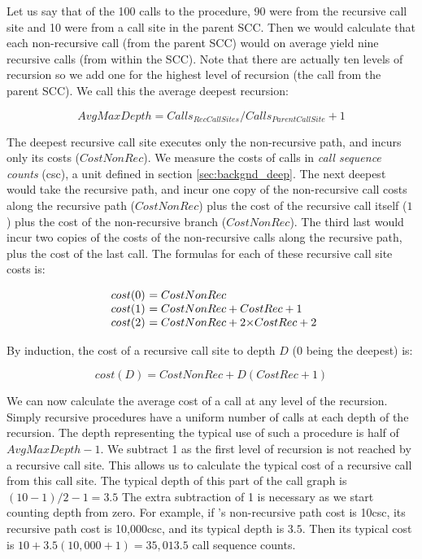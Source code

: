 Let us say that of the 100 calls to the procedure,
90 were from the recursive call site
and 10 were from a call site in the parent SCC.
Then we would calculate
that each non-recursive call
(from the parent SCC)
would on average yield nine recursive calls
(from within the SCC).
Note that there are actually ten levels of recursion so we add one for the
highest level of recursion (the call from the parent SCC).
We call this the average deepest recursion:

\begin{equation*}
AvgMaxDepth = Calls_{RecCallSites} / Calls_{ParentCallSite} + 1
\end{equation*}

The deepest recursive call site executes only the non-recursive path,
and incurs only its costs ($CostNonRec$).
We measure the costs of calls in \emph{call sequence counts} (csc),
a unit defined in section \ref{sec:backgnd_deep}.
The next deepest would take the recursive path,
and incur one copy of the non-recursive call costs along the recursive path
($CostNonRec$)
plus the cost of the recursive call itself ($1$)
plus the cost of the non-recursive branch ($CostNonRec$).
The third last would incur two copies of the costs
of the non-recursive calls along the recursive path,
plus the cost of the last call.
The formulas for each of these recursive call site costs is:

\[
\begin{array}{r @{}l @{}l}
cost(0)~&= CostNonRec \\
cost(1)~&= CostNonRec + CostRec + 1 \\
cost(2)~&= CostNonRec + 2{\times}CostRec + 2
\end{array}
\]

\noindent
By induction,
the cost of a recursive call site to depth $D$ (0 being the deepest)
is:

\begin{equation*}
cost(D) = CostNonRec + D(CostRec + 1)
\end{equation*}

We can now calculate the average cost of a call at any level of the
recursion.
Simply recursive procedures have a uniform number of calls at each depth of
the recursion.
The depth representing the typical use of such a procedure is half of
$AvgMaxDepth - 1$.
We subtract 1 as the first level of recursion is not reached by a recursive
call site.
This allows us to calculate the typical cost of a recursive call from this
call site.
The typical depth of this part of the call graph is $(10 - 1)/2 - 1 = 3.5$
The extra subtraction of 1 is necessary as we start counting depth from
zero.
For example, if \mapfoldl's non-recursive path cost is 10csc,
its recursive path cost is 10,000csc,
and its typical depth is $3.5$.
Then its typical cost is $10 + 3.5(10,000 + 1) = 35,013.5$ call sequence counts.

